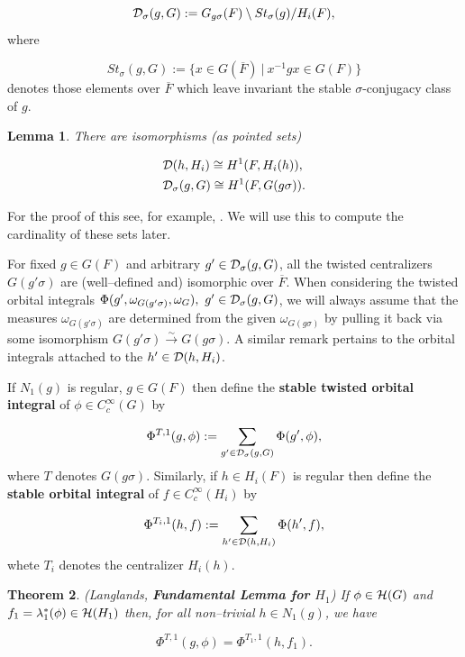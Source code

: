 \documentclass[12pt,letterpaper]{article}
\newtheorem{theorem}{Theorem}
\newtheorem{lemma}[theorem]{Lemma}
\def\hhh{{\cal H}}
\def\ddd{{\cal D}}
\def\tarrow{\stackrel{\sim}{\rightarrow}}
\def\ovF{\overline{F}}
\begin{document}
\begin{equation}
\label{eqn:1.20}
\ddd_{\sigma}(g,G) := G_{g\sigma}(F)\setminus St_{\sigma}(g)/H_i(F),
\end{equation}
where

\[
St_{\sigma}(g,G) := \{x \in G(\ovF )\ |\ x^{-1}gx \in G(F)\}
\]
denotes those elements over $\ovF$ which leave invariant the 
stable $\sigma$-conjugacy class of $g$.

\begin{lemma}
\label{lemma:1.21} 
There are isomorphisms (as pointed sets)

\[
\begin{split}
&\ddd (h, H_i) \cong H^1(F,H_i(h)),\\
&\ddd_{\sigma}(g,G) \cong H^1 (F,G(g\sigma)).
\end{split}
\]
\end{lemma}
 
For the proof of this see, for example, \cite{La2}. We will use this to
compute the cardinality of these sets later.
 
For fixed $g \in G(F)$ and arbitrary $g' \in \ddd_{\sigma}(g,G)$, 
all the twisted centralizers $G(g'\sigma)$ are (well--defined and)
isomorphic over $\ovF$. 
When considering the twisted orbital integrals
$\Phi (g',\omega_{G(g'\sigma )},\omega_G),\ g' \in \ddd_{\sigma}(g,G)$, 
we will always assume that the measures $\omega_{G(g'\sigma )}$ are determined
from the given $\omega_{G(g\sigma )}$ by pulling it back via some isomorphism
$G(g'\sigma) \tarrow G(g\sigma)$. 
A similar remark pertains to the 
orbital integrals attached to the $h' \in \ddd (h,H_i)$.
 
If $N_1(g)$ is regular, $g \in G(F)$ then define the {\bf stable twisted 
orbital integral} of $\phi \in C^\infty_c(G)$ by

\begin{equation}
\label{eqn:1.22}
\Phi^{T,1}(g,\phi ):= \sum_{g' \in \ddd_{\sigma}(g,G)} \Phi (g',\phi ),
\end{equation}
where $T$ denotes $G(g\sigma )$.
Similarly, if $h \in H_i(F)$ is regular then define the
{\bf stable orbital integral} of $f \in C^\infty_c(H_i)$ by

\begin{equation}
\label{eqn:1.23}
\Phi^{T_i,1}(h,f):= \sum_{h' \in \ddd(h,H_i)} \Phi (h',f),
\end{equation}
whete $T_i$ denotes the centralizer $H_i(h)$.

\begin{theorem} (Langlands,
{\bf Fundamental Lemma for $H_1$})
\label{thrm:fundlemmaH1}
If
$\phi \in \hhh (G)$ and $f_1 = \lambda_1^*(\phi ) \in
\hhh (H_1)$ then, for all non--trivial $h \in N_1(g)$, we have

\begin{equation}
\label{eqn:1.24}
\Phi^{T,1}(g,\phi ) = \Phi^{T_1,1}(h,f_1).
\end{equation}
\end{theorem}
 
\end{document}
